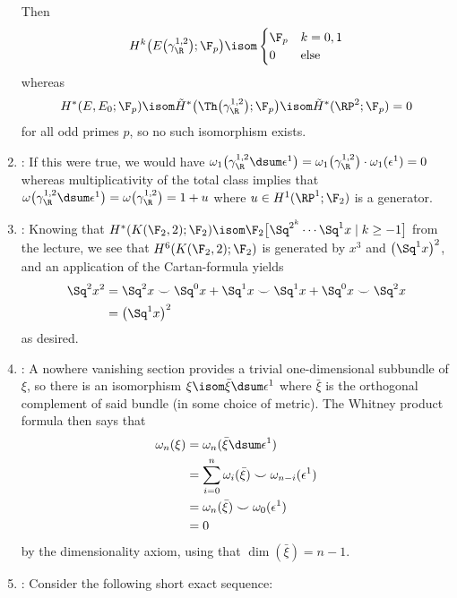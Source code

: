 \begin{answers}
\begin{enumerate}
			Then 
			\begin{equation*}
				H^k\big(E\big(\gamma_\R^{1, 2}\big); \F_p\big) \isom \begin{cases}
					\F_p 	& k = 0, 1 \\
					0 		& \text{else} 
				\end{cases}
			\end{equation*}
			whereas
			\begin{equation*}
				H^*(E, E_0; \F_p) \isom \tilde{H}^*\big(\Th\big(\gamma_\R^{1, 2}\big); \F_p\big) \isom \tilde{H}^*(\RP^2; \F_p) = 0
			\end{equation*}
			for all odd primes $p$, so no such isomorphism exists.
		\item {}: If this were true, we would have $\omega_1\big(\gamma_\R^{1, 2} \dsum \epsilon^1\big) = \omega_1\big(\gamma_\R^{1, 2}\big) \cdot \omega_1(\epsilon^1) = 0$ whereas multiplicativity of the total class implies that $\omega\big(\gamma_\R^{1, 2} \dsum \epsilon^1\big) = \omega\big(\gamma_\R^{1, 2}\big) = 1 + u$ where $u \in H^1(\RP^1; \F_2)$ is a generator.
		\item {}: Knowing that $H^*(K(\F_2, 2); \F_2) \isom \F_2\big[\Sq^{2^k} \cdots \Sq^1 x \mid k \geq -1\big]$ from the lecture, we see that $H^6(K(\F_2, 2); \F_2)$ is generated by $x^3$ and $\big(\Sq^1 x\big)^2$, and an application of the Cartan-formula yields
			\begin{align*}
				\Sq^2 x^2 &= \Sq^2 x \smile \Sq^0 x + \Sq^1 x \smile \Sq^1 x + \Sq^0 x \smile \Sq^2 x \\ 
						  &= \big(\Sq^1 x\big)^2
			\end{align*}
			as desired.
		\item {}: A nowhere vanishing section provides a trivial one-dimensional subbundle of $\xi$, so there is an isomorphism $\xi \isom \bar{\xi} \dsum \epsilon^1$ where $\bar{\xi}$ is the orthogonal complement of said bundle (in some choice of metric).
			The Whitney product formula then says that
			\begin{align*}
				\omega_n(\xi) &= \omega_n(\bar{\xi} \dsum \epsilon^1) \\ 
							  &= \sum_{i = 0}^n \omega_i(\bar{\xi}) \smile \omega_{n - i}(\epsilon^1) \\
							  &= \omega_n(\bar{\xi}) \smile \omega_0(\epsilon^1) \\
							  &= 0
			\end{align*}
			by the dimensionality axiom, using that $\dim(\bar{\xi}) = n - 1$.
		\item {}: Consider the following short exact sequence:

\end{enumerate}
\end{answers}
